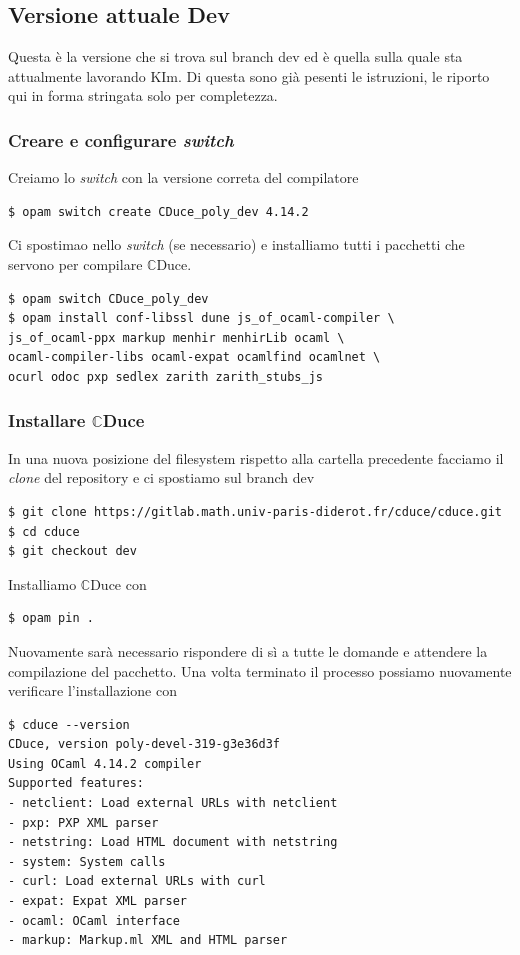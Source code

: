 \documentclass[]{article}
\newcommand{\cduce}{$\mathbb {C}$Duce\xspace}
\begin{document}
\subsection{Versione attuale Dev}
Questa è la versione che si trova sul branch dev ed è quella sulla quale sta attualmente lavorando KIm. Di questa sono già pesenti le istruzioni, le riporto qui in forma stringata solo per completezza.
\subsubsection*{Creare e configurare \textit{switch}}
Creiamo lo \textit{switch} con la versione correta del compilatore
\begin{verbatim}
$ opam switch create CDuce_poly_dev 4.14.2
\end{verbatim}
\newpage
Ci spostimao nello \textit{switch} (se necessario) e installiamo tutti i pacchetti che servono per compilare \cduce.
\begin{verbatim}
$ opam switch CDuce_poly_dev
$ opam install conf-libssl dune js_of_ocaml-compiler \
js_of_ocaml-ppx markup menhir menhirLib ocaml \
ocaml-compiler-libs ocaml-expat ocamlfind ocamlnet \
ocurl odoc pxp sedlex zarith zarith_stubs_js
\end{verbatim}
\subsubsection*{Installare \cduce}
In una nuova posizione del filesystem rispetto alla cartella precedente facciamo il \textit{clone} del repository e ci spostiamo sul branch dev
\begin{verbatim}
$ git clone https://gitlab.math.univ-paris-diderot.fr/cduce/cduce.git
$ cd cduce
$ git checkout dev
\end{verbatim}
Installiamo \cduce con 
\begin{verbatim}
$ opam pin .
\end{verbatim}
Nuovamente sarà necessario rispondere di sì a tutte le domande e attendere la compilazione del pacchetto. Una volta terminato il processo possiamo nuovamente verificare l'installazione con
\begin{verbatim}
$ cduce --version
CDuce, version poly-devel-319-g3e36d3f
Using OCaml 4.14.2 compiler
Supported features: 
- netclient: Load external URLs with netclient
- pxp: PXP XML parser
- netstring: Load HTML document with netstring
- system: System calls
- curl: Load external URLs with curl
- expat: Expat XML parser
- ocaml: OCaml interface
- markup: Markup.ml XML and HTML parser
\end{verbatim}
\end{document}
